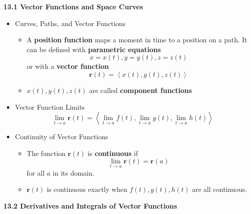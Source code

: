 \documentclass[12pt]{article}
\renewcommand{\vec}[1]{\mathbf{#1}}
\newcommand{\<}{\left<}
\renewcommand{\>}{\right>}
\begin{document}
\newpage

\centerline{\bf 13.1 Vector Functions and Space Curves}

\begin{itemize}
  \item Curves, Paths, and Vector Functions
    \begin{itemize}
      \item A \textbf{position function} maps a moment in time to a position on a path. It can be defined with \textbf{parametric equations} \[x=x(t), y=y(t), z=z(t)\] or with a \textbf{vector function} \[\vec{r}(t) = \<x(t),y(t),z(t)\>\]
      \item $x(t),y(t),z(t)$ are called \textbf{component functions}
    \end{itemize}

  \item Vector Function Limits
    \[\lim_{t\to a} \vec{r}(t) = \<\lim_{t\to a} f(t), \lim_{t\to a} g(t), \lim_{t\to a} h(t)\>\]

  \item Continuity of Vector Functions
    \begin{itemize}
      \item
      The function $\vec{r}(t)$ is \textbf{continuous} if \[\lim_{t\to a}\vec{r}(t) = \vec{r}(a)\] for all $a$ in its domain.
      \item $\vec{r}(t)$ is continuous exactly when $f(t),g(t),h(t)$ are all continuous.
    \end{itemize}
\end{itemize}

\newpage

\centerline{\bf 13.2 Derivatives and Integrals of Vector Functions}
\end{document}
